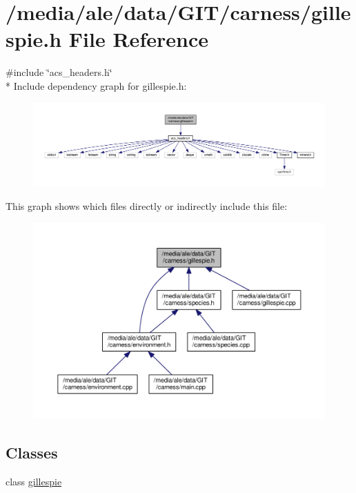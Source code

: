 \hypertarget{a00032}{\section{/media/ale/data/\-G\-I\-T/carness/gillespie.h File Reference}
\label{a00032}
}
{\ttfamily \#include \char`\"{}acs\-\_\-headers.\-h\char`\"{}}\\*
Include dependency graph for gillespie.\-h\-:\nopagebreak
\begin{figure}[H]
\begin{center}
\leavevmode
\includegraphics[width=350pt]{a00062}
\end{center}
\end{figure}
This graph shows which files directly or indirectly include this file\-:\nopagebreak
\begin{figure}[H]
\begin{center}
\leavevmode
\includegraphics[width=350pt]{a00063}
\end{center}
\end{figure}
\subsection*{Classes}
\begin{DoxyCompactItemize}
\item 
class \hyperlink{a00012}{gillespie}
\end{DoxyCompactItemize}
